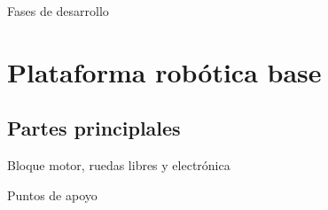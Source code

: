 \documentclass{beamer}
\begin{document}






\begin{frame}{Fases de desarrollo}
\end{frame}






\section{Plataforma robótica base}
\subsection{Partes principlales}

\begin{frame}{Bloque motor, ruedas libres y electrónica}
\end{frame}

\begin{frame}{Puntos de apoyo}
\end{frame}
\end{document}
